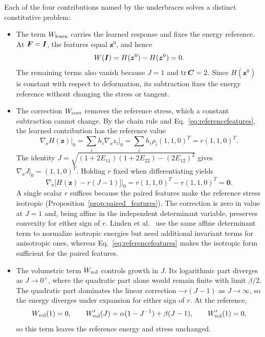 Each of the four contributions named by the underbraces solves a distinct constitutive problem:
\begin{itemize}
 \item[(i)] The term $W_{\rm learn}$ carries the learned response and fixes the energy reference. At $\bm F=\bm I$, the features equal $\bm z^0$, and hence
 \begin{equation}
  W(\bm I)=H(\bm z^0)-H(\bm z^0)=0.
  \label{eq:energy_reference_value}
 \end{equation}
 The remaining terms also vanish because $J=1$ and $\operatorname{tr}\bm C=2$. Since $H(\bm z^0)$ is constant with respect to deformation, its subtraction fixes the energy reference without changing the stress or tangent.

 \item[(ii)] The correction $W_{\rm corr}$ removes the reference stress, which a constant subtraction cannot change. By the chain rule and Eq.~\eqref{eq:referencefeatures}, the learned contribution has the reference value
 \begin{equation}
  \left.\nabla_{\ee}H(\bm z)\right|_0
  =\sum_i h_i\left.\nabla_{\ee}z_i\right|_0
  =\sum_i h_i\rho_i(1,1,0)^T
  =r(1,1,0)^T.
  \label{eq:neural_reference_stress}
 \end{equation}
 The identity $J=\sqrt{(1+2E_{11})(1+2E_{22})-(2E_{12})^2}$ gives $\nabla_{\ee}J|_0=(1,1,0)^T$. Holding $r$ fixed when differentiating yields
 \begin{equation}
  \left.\nabla_{\ee}\big[H(\bm z)-r(J-1)\big]\right|_0
  =r(1,1,0)^T-r(1,1,0)^T=\bm0.
  \label{eq:energy_reference_stress}
 \end{equation}
 A single scalar $r$ suffices because the paired features make the reference stress isotropic (Proposition~\ref{prop:paired_features}). The correction is zero in value at $J=1$ and, being affine in the independent determinant variable, preserves convexity for either sign of $r$. Linden et al.~\cite{linden2023} use the same affine determinant term to normalize isotropic energies but need additional invariant terms for anisotropic ones, whereas Eq.~\eqref{eq:referencefeatures} makes the isotropic form sufficient for the paired features.

 \item[(iii)] The volumetric term $W_{\rm vol}$ controls growth in $J$. Its logarithmic part diverges as $J\to0^+$, where the quadratic part alone would remain finite with limit $\beta/2$. The quadratic part dominates the linear correction $-r(J-1)$ as $J\to\infty$, so the energy diverges under expansion for either sign of $r$. At the reference,
 \begin{equation}
  W_{\rm vol}(1)=0,\qquad
  W_{\rm vol}'(J)=\alpha(1-J^{-1})+\beta(J-1),\qquad
  W_{\rm vol}'(1)=0,
 \end{equation}
 so this term leaves the reference energy and stress unchanged.


\end{itemize}
